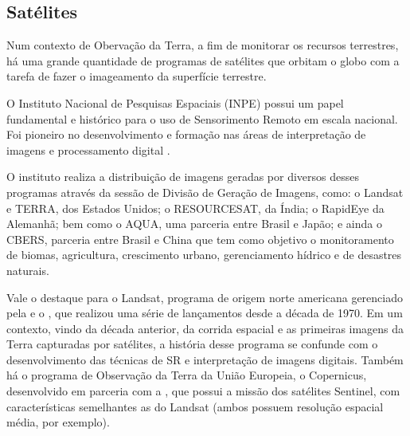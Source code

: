 

\subsection{Satélites}\label{satuxe9lites}

Num contexto de Obervação da Terra, a fim de monitorar os
recursos terrestres, há uma grande quantidade de programas de satélites
que orbitam o globo com a tarefa de fazer o imageamento da superfície
terrestre. 

O Instituto Nacional de Pesquisas Espaciais (INPE) possui um papel
fundamental e histórico para o uso de Sensorimento Remoto em escala nacional. Foi pioneiro no desenvolvimento e formação nas áreas de interpretação de imagens e processamento digital \cite{meneses2012introduccao}.

O instituto realiza a distribuição de imagens geradas por
diversos desses programas através da sessão de Divisão de Geração de
Imagens, como: o Landsat e TERRA, dos Estados Unidos; o
RESOURCESAT, da Índia; o RapidEye da Alemanhã; bem como o AQUA, uma parceria entre Brasil e Japão; e ainda o CBERS, parceria entre Brasil e China que tem como objetivo o monitoramento de biomas, agricultura,
crescimento urbano, gerenciamento hídrico e de desastres naturais. \cite{inpe-dgi}

Vale o destaque para o Landsat, programa de origem norte americana
gerenciado pela   e
o , que realizou uma série de
lançamentos desde a década de 1970. Em um contexto, vindo da década
anterior, da corrida espacial e as primeiras imagens da Terra capturadas
por satélites, a história desse programa se confunde com o
desenvolvimento das técnicas de SR e interpretação de imagens digitais.
Também há o programa de Observação da Terra da União Europeia, o Copernicus, desenvolvido
em parceria com a , que possui a missão dos satélites Sentinel, com características semelhantes as do Landsat (ambos possuem resolução espacial média, por exemplo).


